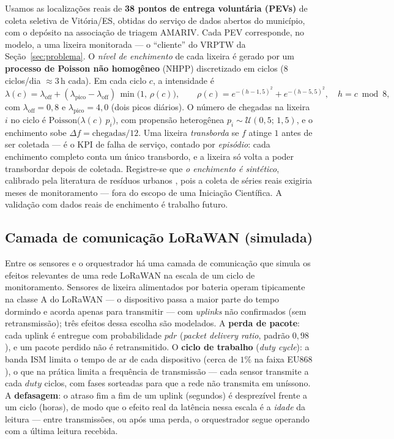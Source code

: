 \documentclass[12pt, a4paper]{article}
\begin{document}
 Usamos as localizações reais de \textbf{38 pontos de entrega voluntária (PEVs)} de coleta seletiva de Vitória/ES, obtidas do serviço de dados abertos do município, com o depósito na associação de triagem AMARIV. Cada PEV corresponde, no modelo, a uma lixeira monitorada --- o ``cliente'' do VRPTW da Seção~\ref{sec:problema}. O \emph{nível de enchimento} de cada lixeira é gerado por um \textbf{processo de Poisson não homogêneo} (NHPP) discretizado em ciclos ($8$ ciclos/dia $\approx 3$\,h cada). Em cada ciclo $c$, a intensidade é
\begin{equation}
\lambda(c)=\lambda_{\mathrm{off}}+(\lambda_{\mathrm{pico}}-\lambda_{\mathrm{off}})\,\min\!\big(1,\,\rho(c)\big),\qquad
\rho(c)=e^{-(h-1{,}5)^2}+e^{-(h-5{,}5)^2},\quad h=c\bmod 8,
\end{equation}
com $\lambda_{\mathrm{off}}=0{,}8$ e $\lambda_{\mathrm{pico}}=4{,}0$ (dois picos diários). O número de chegadas na lixeira $i$ no ciclo é $\mathrm{Poisson}\big(\lambda(c)\,p_i\big)$, com propensão heterogênea $p_i\sim\mathcal{U}(0{,}5;\,1{,}5)$, e o enchimento sobe $\Delta f=\text{chegadas}/12$. Uma lixeira \emph{transborda} se $f$ atinge $1$ antes de ser coletada --- é o KPI de falha de serviço, contado por \emph{episódio}: cada enchimento completo conta um único transbordo, e a lixeira só volta a poder transbordar depois de coletada. Registre-se que \emph{o enchimento é sintético}, calibrado pela literatura de resíduos urbanos \citep{lozano2018smart,barth2023data}, pois a coleta de séries reais exigiria meses de monitoramento --- fora do escopo de uma Iniciação Científica. A validação com dados reais de enchimento é trabalho futuro.

\subsection{Camada de comunicação LoRaWAN (simulada)}\label{sec:lorawan}
Entre os sensores e o orquestrador há uma camada de comunicação que simula os efeitos relevantes de uma rede LoRaWAN na escala de um ciclo de monitoramento. Sensores de lixeira alimentados por bateria operam tipicamente na classe A do LoRaWAN --- o dispositivo passa a maior parte do tempo dormindo e acorda apenas para transmitir \citep{adelantado2017limits,ramson2021lorawan} --- com \emph{uplinks} não confirmados (sem retransmissão); três efeitos dessa escolha são modelados. A \textbf{perda de pacote}: cada uplink é entregue com probabilidade $\mathit{pdr}$ (\emph{packet delivery ratio}, padrão $0{,}98$), e um pacote perdido não é retransmitido. O \textbf{ciclo de trabalho} (\textit{duty cycle}): a banda ISM limita o tempo de ar de cada dispositivo (cerca de $1\%$ na faixa EU868 \citep{adelantado2017limits}), o que na prática limita a frequência de transmissão --- cada sensor transmite a cada $\mathit{duty}$ ciclos, com fases sorteadas para que a rede não transmita em uníssono. A \textbf{defasagem}: o atraso fim a fim de um uplink (segundos) é desprezível frente a um ciclo (horas), de modo que o efeito real da latência nessa escala é a \emph{idade} da leitura --- entre transmissões, ou após uma perda, o orquestrador segue operando com a última leitura recebida.
\end{document}
